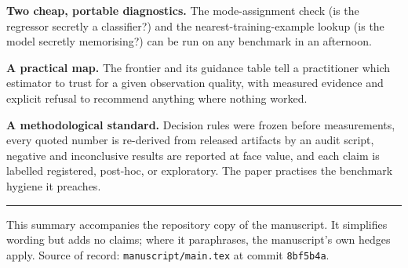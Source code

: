 \documentclass[11pt,a4paper]{article}
\begin{document}
\textbf{Two cheap, portable diagnostics.} The mode-assignment check (is the
regressor secretly a classifier?) and the nearest-training-example lookup
(is the model secretly memorising?) can be run on any benchmark in an
afternoon.

\textbf{A practical map.} The frontier and its guidance table tell a
practitioner which estimator to trust for a given observation quality, with
measured evidence and explicit refusal to recommend anything where nothing
worked.

\textbf{A methodological standard.} Decision rules were frozen before
measurements, every quoted number is re-derived from released artifacts by
an audit script, negative and inconclusive results are reported at face
value, and each claim is labelled registered, post-hoc, or exploratory. The
paper practises the benchmark hygiene it preaches.

\vspace{6pt}
\noindent\rule{\textwidth}{0.4pt}
\vspace{2pt}

\noindent\small This summary accompanies the repository copy of the
manuscript. It simplifies wording but adds no claims; where it paraphrases,
the manuscript's own hedges apply. Source of record:
\texttt{manuscript/main.tex} at commit \texttt{8bf5b4a}.
\end{document}
